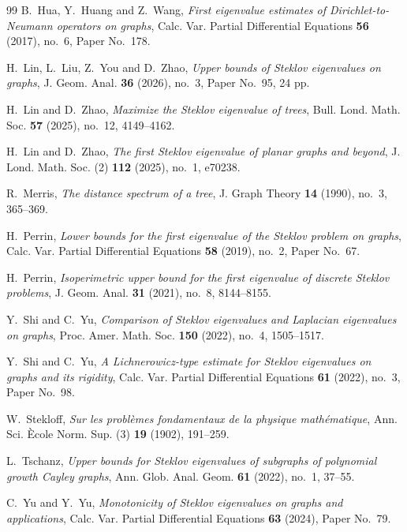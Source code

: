 \documentclass[11pt]{article}
\theoremstyle{remark}
\begin{document}
\begin{thebibliography}{99}
B.~Hua, Y.~Huang and Z.~Wang,
\emph{First eigenvalue estimates of Dirichlet-to-Neumann operators on graphs},
Calc. Var. Partial Differential Equations \textbf{56} (2017), no.~6, Paper No.~178.

H.~Lin, L.~Liu, Z.~You and D.~Zhao,
\emph{Upper bounds of Steklov eigenvalues on graphs},
J. Geom. Anal. \textbf{36} (2026), no.~3, Paper No.~95, 24 pp.

H.~Lin and D.~Zhao,
\emph{Maximize the Steklov eigenvalue of trees},
Bull. Lond. Math. Soc. \textbf{57} (2025), no.~12, 4149--4162.

H.~Lin and D.~Zhao,
\emph{The first Steklov eigenvalue of planar graphs and beyond},
J. Lond. Math. Soc. (2) \textbf{112} (2025), no.~1, e70238.

R.~Merris,
\emph{The distance spectrum of a tree},
J. Graph Theory \textbf{14} (1990), no.~3, 365--369.

H.~Perrin,
\emph{Lower bounds for the first eigenvalue of the Steklov problem on graphs},
Calc. Var. Partial Differential Equations \textbf{58} (2019), no.~2, Paper No.~67.

H.~Perrin,
\emph{Isoperimetric upper bound for the first eigenvalue of discrete Steklov problems},
J. Geom. Anal. \textbf{31} (2021), no.~8, 8144--8155.

Y.~Shi and C.~Yu,
\emph{Comparison of Steklov eigenvalues and Laplacian eigenvalues on graphs},
Proc. Amer. Math. Soc. \textbf{150} (2022), no.~4, 1505--1517.

Y.~Shi and C.~Yu,
\emph{A Lichnerowicz-type estimate for Steklov eigenvalues on graphs and its rigidity},
Calc. Var. Partial Differential Equations \textbf{61} (2022), no.~3, Paper No.~98.

W.~Stekloff,
\emph{Sur les probl\`emes fondamentaux de la physique math\'ematique},
Ann. Sci. \`Ecole Norm. Sup. (3) \textbf{19} (1902), 191--259.

L.~Tschanz,
\emph{Upper bounds for Steklov eigenvalues of subgraphs of polynomial growth Cayley graphs},
Ann. Glob. Anal. Geom. \textbf{61} (2022), no.~1, 37--55.

C.~Yu and Y.~Yu,
\emph{Monotonicity of Steklov eigenvalues on graphs and applications},
Calc. Var. Partial Differential Equations \textbf{63} (2024), Paper No.~79.

\end{thebibliography}
\end{document}
